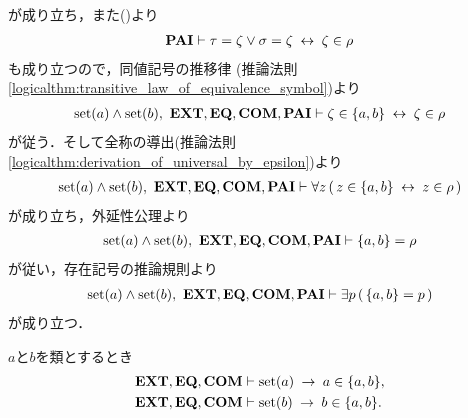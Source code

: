 \begin{sketch}
\begin{description}
				が成り立ち，また()より
				\begin{align}
					\mbox{{\bf PAI}} \vdash \tau = \zeta \vee \sigma = \zeta \hspace{0.25em}\leftrightarrow\hspace{0.25em} \zeta \in \rho
				\end{align}
				も成り立つので，同値記号の推移律
				(推論法則\ref{logicalthm:transitive_law_of_equivalence_symbol})より
				\begin{align}
					\operatorname*{set} (a) \wedge \operatorname*{set} (b),\ \mbox{{\bf EXT}},\mbox{{\bf EQ}},\mbox{\bf COM},\mbox{{\bf PAI}} \vdash 
					\zeta \in \{a,b\} \hspace{0.25em}\leftrightarrow\hspace{0.25em} \zeta \in \rho
				\end{align}
				が従う．そして全称の導出(推論法則\ref{logicalthm:derivation_of_universal_by_epsilon})より
				\begin{align}
					\operatorname*{set} (a) \wedge \operatorname*{set} (b),\ \mbox{{\bf EXT}},\mbox{{\bf EQ}},\mbox{\bf COM},\mbox{{\bf PAI}} \vdash 
					\forall z\, (\, z \in \{a,b\} \hspace{0.25em}\leftrightarrow\hspace{0.25em} z \in \rho\, )
				\end{align}
				が成り立ち，外延性公理より
				\begin{align}
					\operatorname*{set} (a) \wedge \operatorname*{set} (b),\ \mbox{{\bf EXT}},\mbox{{\bf EQ}},\mbox{\bf COM},\mbox{{\bf PAI}} \vdash 
					\{a,b\} = \rho
				\end{align}
				が従い，存在記号の推論規則より
				\begin{align}
					\operatorname*{set} (a) \wedge \operatorname*{set} (b),\ \mbox{{\bf EXT}},\mbox{{\bf EQ}},\mbox{\bf COM},\mbox{{\bf PAI}} \vdash 
					\exists p\, (\, \{a,b\} = p\, )
				\end{align}
				が成り立つ．
				\QED
		\end{description}
	\end{sketch}
	
	\begin{screen}
		\begin{thm}[集合は対の要素となれる]\label{thm:set_is_an_element_of_its_pair}
			$a$と$b$を類とするとき
			\begin{align}
				\mbox{{\bf EXT}},\mbox{{\bf EQ}},\mbox{\bf COM} &\vdash \operatorname*{set} (a) \hspace{0.25em}\rightarrow\hspace{0.25em} a \in \{a,b\}, \\
				\mbox{{\bf EXT}},\mbox{{\bf EQ}},\mbox{\bf COM} &\vdash \operatorname*{set} (b) \hspace{0.25em}\rightarrow\hspace{0.25em} b \in \{a,b\}.
			\end{align}
		\end{thm}
	\end{screen}
	
